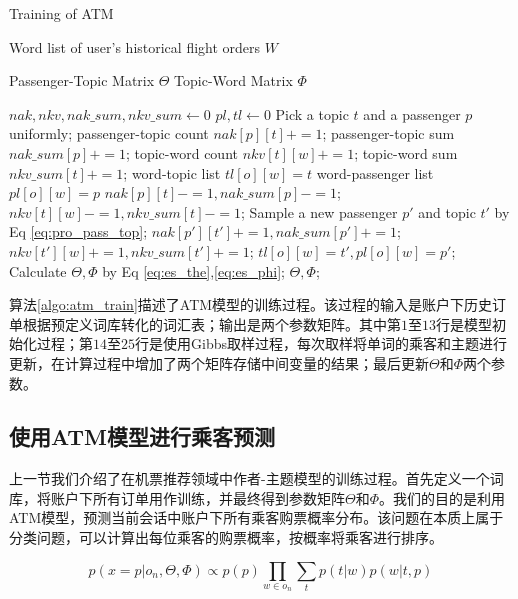 \begin{algorithm}
\caption{Training of ATM}
\label{algo:atm_train}
\begin{algorithmic}[1]
\Require
\Statex Word list of user's historical flight orders $W$

\Ensure 
\Statex Passenger-Topic Matrix $\Theta$
\Statex Topic-Word Matrix $\Phi$

\State $nak , nkv, nak\_sum, nkv\_sum \gets 0$
\State $pl , tl \gets 0$
\State Pick a topic $t$ and a passenger $p$ uniformly;
\State passenger-topic count $nak[p][t] += 1$;
\State passenger-topic sum $nak\_sum[p] += 1$;
\State topic-word count $nkv[t][w] += 1$;
\State topic-word sum $nkv\_sum[t] += 1$;
\State word-topic list $tl[o][w] = t$
\State word-passenger list $pl[o][w] = p$
\EndFor
\EndFor
{}
\State $nak[p][t] -= 1, nak\_sum[p] -= 1$;
\State $nkv[t][w] -= 1, nkv\_sum[t] -= 1$;
\State Sample a new passenger $p'$ and topic $t'$ by Eq \ref{eq:pro_pass_top};
\State $nak[p'][t'] += 1, nak\_sum[p'] += 1$;
\State $nkv[t'][w] += 1, nkv\_sum[t'] += 1$;
\State $tl[o][w] = t', pl[o][w] = p'$;
\EndFor
\EndFor
\EndWhile
\State Calculate $\Theta,\Phi$ by Eq \ref{eq:es_the},\ref{eq:es_phi};
\State \Return $\Theta,\Phi$;
\end{algorithmic} 
\end{algorithm}

算法\ref{algo:atm_train}描述了ATM模型的训练过程。该过程的输入是账户下历史订单根据预定义词库转化的词汇表；输出是两个参数矩阵。其中第$1$至$13$行是模型初始化过程；第$14$至$25$行是使用Gibbs取样过程，每次取样将单词的乘客和主题进行更新，在计算过程中增加了两个矩阵存储中间变量的结果；最后更新$\Theta$和$\Phi$两个参数。

\subsection{使用ATM模型进行乘客预测}

上一节我们介绍了在机票推荐领域中作者-主题模型的训练过程。首先定义一个词库，将账户下所有订单用作训练，并最终得到参数矩阵$\Theta$和$\Phi$。我们的目的是利用ATM模型，预测当前会话中账户下所有乘客购票概率分布。该问题在本质上属于分类问题，可以计算出每位乘客的购票概率，按概率将乘客进行排序。

\begin{equation}
\label{eq:pred_pass}
p(x=p|o_n,\Theta,\Phi) \propto p(p)\prod_{w \in o_n}\sum_t p(t|w)p(w|t,p)
\end{equation}

